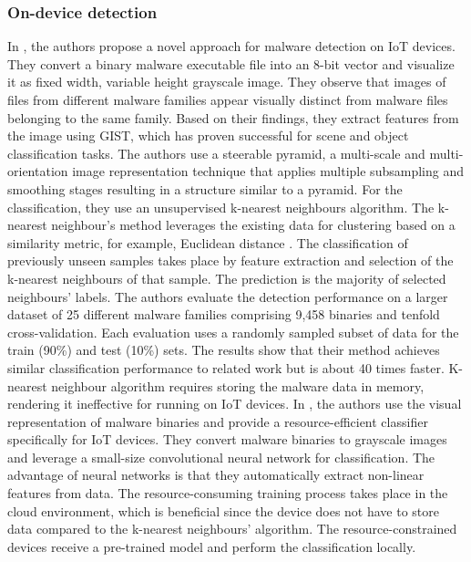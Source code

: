\documentclass[conference, 11pt]{IEEEtran}
\begin{document}
    \subsubsection{On-device detection}
    In \cite{article:7}, the authors propose a novel approach for malware detection on IoT devices.
    They convert a binary malware executable file into an 8-bit vector and visualize it as fixed width, variable height grayscale image.
    They observe that images of files from different malware families appear visually distinct from malware files belonging to the same family.
    Based on their findings, they extract features from the image using GIST, which has proven successful for scene and object classification tasks.
    The authors use a steerable pyramid, a multi-scale and multi-orientation image representation technique that applies multiple subsampling and smoothing stages resulting in a structure similar to a pyramid.
    For the classification, they use an unsupervised k-nearest neighbours algorithm.
    The k-nearest neighbour's method leverages the existing data for clustering based on a similarity metric, for example, Euclidean distance .
    The classification of previously unseen samples takes place by feature extraction and selection of the k-nearest neighbours of that sample.
    The prediction is the majority of selected neighbours' labels.
    The authors evaluate the detection performance on a larger dataset of 25 different malware families comprising 9,458 binaries and tenfold cross-validation.
    Each evaluation uses a randomly sampled subset of data for the train (90\%) and test (10\%) sets.
    The results show that their method achieves similar classification performance to related work but is about 40 times faster.
    K-nearest neighbour algorithm requires storing the malware data in memory, rendering it ineffective for running on IoT devices.
    In \cite{article:3}, the authors use the visual representation of malware binaries and provide a resource-efficient classifier specifically for IoT devices.
    They convert malware binaries to grayscale images and leverage a small-size convolutional neural network for classification.
    The advantage of neural networks is that they automatically extract non-linear features from data.
    The resource-consuming training process takes place in the cloud environment, which is beneficial since the device does not have to store data compared to the k-nearest neighbours' algorithm.
    The resource-constrained devices receive a pre-trained model and perform the classification locally.
\end{document}
